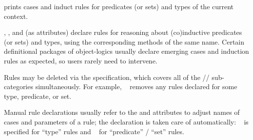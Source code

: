 \begin{isabellebody}
\begin{isamarkuptext}
\begin{description}
  \item \hyperlink{command.print-induct-rules}{\mbox{}} prints cases and induct rules
  for predicates (or sets) and types of the current context.
  
  \item \hyperlink{attribute.cases}{\mbox{}}, \hyperlink{attribute.induct}{\mbox{}}, and \hyperlink{attribute.coinduct}{\mbox{}} (as attributes) declare rules for reasoning about
  (co)inductive predicates (or sets) and types, using the
  corresponding methods of the same name.  Certain definitional
  packages of object-logics usually declare emerging cases and
  induction rules as expected, so users rarely need to intervene.

  Rules may be deleted via the  specification, which
  covers all of the //
  sub-categories simultaneously.  For example, \hyperlink{attribute.cases}{\mbox{}}~ removes any \hyperlink{attribute.cases}{\mbox{}} rules declared for
  some type, predicate, or set.
  
  Manual rule declarations usually refer to the \hyperlink{attribute.case-names}{\mbox{}} and \hyperlink{attribute.params}{\mbox{}} attributes to adjust names of
  cases and parameters of a rule; the \hyperlink{attribute.consumes}{\mbox{}}
  declaration is taken care of automatically: \hyperlink{attribute.consumes}{\mbox{}}~ is specified for ``type'' rules and \hyperlink{attribute.consumes}{\mbox{}}~ for ``predicate'' / ``set'' rules.

  \end{description}%
\end{isamarkuptext}%
\isamarkuptrue%
%
\isadelimtheory
%
\endisadelimtheory
%
\isatagtheory
{}\isamarkupfalse%
%
\endisatagtheory
{\isafoldtheory}%
%
\isadelimtheory
%
\endisadelimtheory
\isanewline
\end{isabellebody}%
